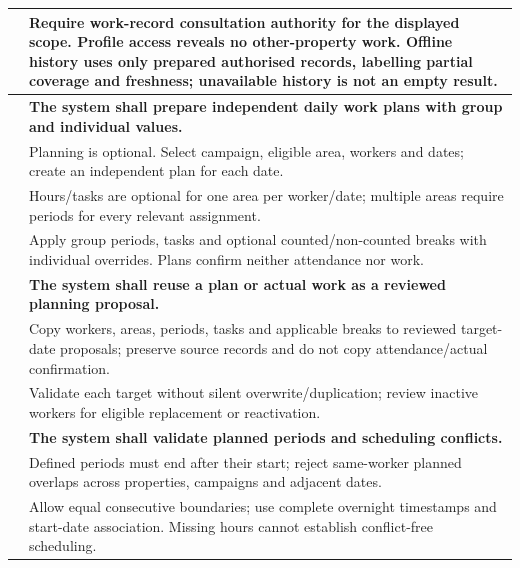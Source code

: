 {\begin{longtable}{L{0.18}L{0.82}}
\label{ac:023:e} & Require work-record consultation authority for the displayed scope. Profile access reveals no other-property work. Offline history uses only prepared authorised records, labelling partial coverage and freshness; unavailable history is not an empty result.\\
\midrule
{}
\label{fr:024}\textbf{} & \textbf{The system shall prepare independent daily work plans with group and individual values.}\\*
\label{ac:024:a} & Planning is optional. Select campaign, eligible area, workers and dates; create an independent plan for each date.\\
\label{ac:024:b} & Hours/tasks are optional for one area per worker/date; multiple areas require periods for every relevant assignment.\\
\label{ac:024:c} & Apply group periods, tasks and optional counted/non-counted breaks with individual overrides. Plans confirm neither attendance nor work.\\
\midrule
{}
\label{fr:025}\textbf{} & \textbf{The system shall reuse a plan or actual work as a reviewed planning proposal.}\\*
\label{ac:025:a} & Copy workers, areas, periods, tasks and applicable breaks to reviewed target-date proposals; preserve source records and do not copy attendance/actual confirmation.\\
\label{ac:025:b} & Validate each target without silent overwrite/duplication; review inactive workers for eligible replacement or reactivation.\\
\midrule
{}
\label{fr:026}\textbf{} & \textbf{The system shall validate planned periods and scheduling conflicts.}\\*
\label{ac:026:a} & Defined periods must end after their start; reject same-worker planned overlaps across properties, campaigns and adjacent dates.\\
\label{ac:026:b} & Allow equal consecutive boundaries; use complete overnight timestamps and start-date association. Missing hours cannot establish conflict-free scheduling.\\

\end{longtable}}
